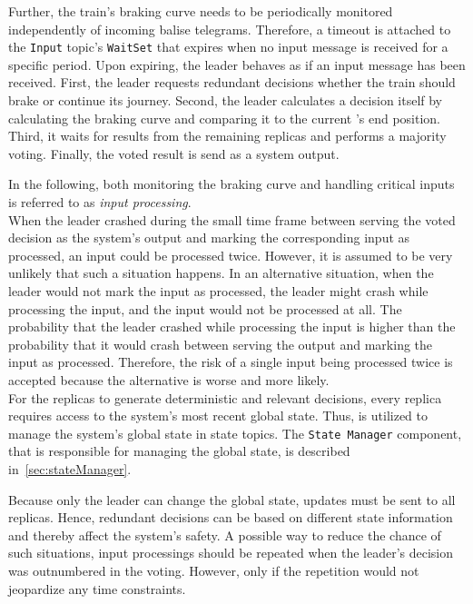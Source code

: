 Further, the train's braking curve needs to be periodically monitored independently of incoming balise telegrams.
Therefore, a timeout is attached to the \texttt{Input} topic's \texttt{WaitSet} that expires when no input message is received for a specific period.
Upon expiring, the leader behaves as if an input message has been received.
First, the leader requests redundant decisions whether the train should brake or continue its journey.
Second, the leader calculates a decision itself by calculating the braking curve and comparing it to the current 's end position.
Third, it waits for results from the remaining replicas and performs a majority voting.
Finally, the voted result is send as a system output.

In the following, both monitoring the braking curve and handling critical inputs is referred to as \textit{input processing}.
\\

When the leader crashed during the small time frame between serving the voted decision as the system's output and marking the corresponding input as processed, an input could be processed twice.
However, it is assumed to be very unlikely that such a situation happens.
In an alternative situation, when the leader would not mark the input as processed, the leader might crash while processing the input, and the input would not be processed at all.
The probability that the leader crashed while processing the input is higher than the probability that it would crash between serving the output and marking the input as processed.
Therefore, the risk of a single input being processed twice is accepted because the alternative is worse and more likely.
\\

For the replicas to generate deterministic and relevant decisions, every replica requires access to the system's most recent global state.
Thus,  is utilized to manage the system's global state in state topics.
The \texttt{State Manager} component, that is responsible for managing the global state, is described in~\autoref{sec:stateManager}.

Because only the leader can change the global state, updates must be sent to all replicas.
Hence, redundant decisions can be based on different state information and thereby affect the system's safety.
A possible way to reduce the chance of such situations, input processings should be repeated when the leader's decision was outnumbered in the voting.
However, only if the repetition would not jeopardize any time constraints.

